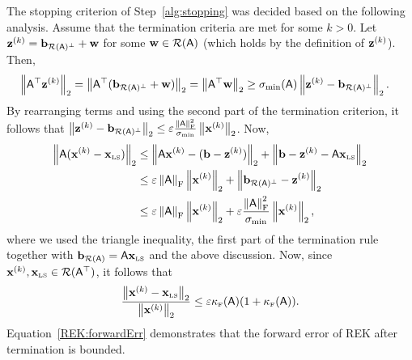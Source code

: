 The stopping criterion of Step~\ref{alg:stopping} was decided based on the following analysis. Assume that the termination criteria are met for some $k>0$. Let $\z^{(k)} = \bc + \w$ for some $\w\in\colspan{\matA}$ (which holds by the definition of $\z^{(k)}$). Then,
\begin{align*}
	\norm{\matA^\top \z^{(k)}} &= \norm{\matA^\top (\bc + \w)} = \norm{\matA^\top \w} \geq \sigma_{\min}(\matA)\norm{\z^{(k)} - \bc}.
\end{align*}
By rearranging terms and using the second part of the termination criterion, it follows that $\norm{\z^{(k)} - \bc} \leq \eps \frac{\frobnorm{\matA}^2}{\sigma_{\min}} \norm{\x^{(k)}}$. Now,
\begin{align*}
	\norm{\matA(\x^{(k)} - \xls)} & \leq \norm{\matA\x^{(k)} - (\b - \z^{(k)}) } + \norm{ \b- \z^{(k)} - \matA\xls} \\
								  & \leq \eps \frobnorm{\matA} \norm{\x^{(k)}} + \norm{\bc - \z^{(k)}} \\
								  & \leq \eps \frobnorm{\matA} \norm{\x^{(k)}} + \eps \frac{\frobnorm{\matA}^2}{\sigma_{\min}} \norm{\x^{(k)}},
\end{align*}
where we used the triangle inequality, the first part of the termination rule together with $\br = \matA\xls$ and the above discussion.
Now, since $\x^{(k)},\xls \in\colspan{\matA^\top}$, it follows that
\begin{equation}\label{REK:forwardErr}
			\frac{\norm{\x^{(k)} - \xls } }{\norm{\x^{(k)}}} \leq \eps \kappaF(\matA) ( 1 + \kappaF(\matA)).
\end{equation}
Equation~\eqref{REK:forwardErr} demonstrates that the forward error of REK after termination is bounded.
%
